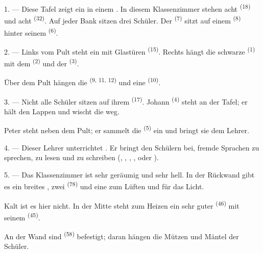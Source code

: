 \VUsaut{3.0mm}

1. --- Diese Tafel zeigt ein  in einem . In
diesem Klassenzimmer stehen acht  \textsuperscript{(18)} und acht
 \textsuperscript{(32)}. Auf jeder Bank sitzen drei Schüler. Der
 \textsuperscript{(7)} sitzt auf einem  \textsuperscript{(8)}
hinter seinem  \textsuperscript{(6)}.

2. --- Links vom Pult steht ein  mit Glastüren
\textsuperscript{(15)}. Rechts hängt die schwarze  \textsuperscript{(1)} mit
dem  \textsuperscript{(2)} und der 
\textsuperscript{(3)}.

Über dem Pult hängen die  \textsuperscript{(9, 11, 12)} und eine
 \textsuperscript{(10)}.

3. --- Nicht alle Schüler sitzen auf ihrem  \textsuperscript{(17)}.
Johann \textsuperscript{(4)} steht an der Tafel; er hält den Lappen und wischt die
 weg.

Peter steht neben dem Pult; er sammelt die 
\textsuperscript{(5)} ein und bringt sie dem Lehrer.

4. --- Dieser Lehrer unterrichtet . Er bringt den
Schülern bei, fremde Sprachen zu sprechen, zu lesen und zu schreiben
(, , , ,
 oder ).

5. --- Das Klassenzimmer ist sehr geräumig und sehr hell. In der Rückwand gibt es
ein breites , zwei  \textsuperscript{(78)} und
eine  zum Lüften und für das Licht.

Kalt ist es hier nicht. In der Mitte steht zum Heizen ein sehr guter
 \textsuperscript{(46)} mit seinem  \textsuperscript{(45)}.

An der Wand sind  \textsuperscript{(58)} befestigt; daran hängen
die Mützen und Mäntel der Schüler.

\VUsaut{5.2mm}
\VUsaut{3.6mm}

